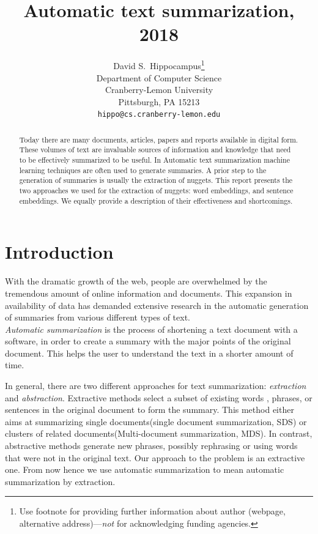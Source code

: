 \documentclass{article}
\title{Automatic text summarization, 2018}
\author{
  David S.~Hippocampus\thanks{Use footnote for providing further
    information about author (webpage, alternative
    address)---\emph{not} for acknowledging funding agencies.} \\
  Department of Computer Science\\
  Cranberry-Lemon University\\
  Pittsburgh, PA 15213 \\
  \texttt{hippo@cs.cranberry-lemon.edu} \\
}
\begin{document}

\maketitle


\begin{abstract}
  Today there are many documents, articles, papers and reports available in digital form. These volumes of text are invaluable sources of information and knowledge that need to be effectively summarized to be useful. In Automatic text summarization machine learning techniques are often used to generate summaries. A prior step to the generation of summaries is usually the extraction of nuggets. This report presents the two approaches we used for the extraction of nuggets: word embeddings, and sentence embeddings. We equally provide a description of their effectiveness and shortcomings. 
  
\end{abstract}

\section{Introduction}

\label{sec:intro}

With the dramatic growth of the web, people are overwhelmed by the tremendous amount of online information and documents. This expansion in availability of data has demanded extensive research in the automatic generation of summaries from various different types of text.\\

\textit{Automatic summarization} is the process of shortening a text document with a software, in order to create a summary with the major points of the original document. This helps the user to understand the text in a shorter amount of time.	     

In general, there  are two different approaches for text summarization: \textit{extraction} and \textit{abstraction}. Extractive methods select a subset of existing words , phrases, or sentences in the original document to form the summary. This method either aims at summarizing single documents(single document summarization, SDS) or clusters of related documents(Multi-document summarization, MDS). In contrast, abstractive methods generate new phrases, possibly rephrasing or using words that were not in the original text. Our approach to the problem is an extractive one. From now hence   we use automatic summarization to mean automatic summarization by extraction. 
\end{document}
